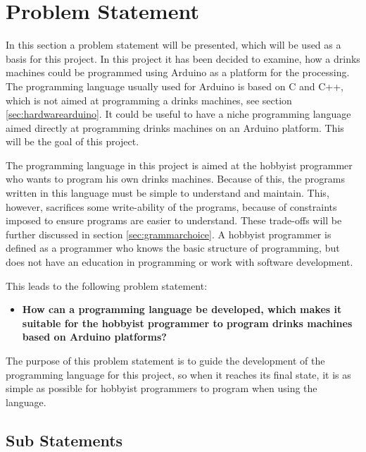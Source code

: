 \section{Problem Statement}
\label{sec:problemstatement}
In this section a problem statement will be presented, which will be used as a basis for this project. In this project it has been decided to examine, how a drinks machines could be programmed using Arduino as a platform for the processing. The programming language usually used for Arduino is based on C and C++, which is not aimed at programming a drinks machines, see section \ref{sec:hardwarearduino}. It could be useful to have a niche programming language aimed directly at programming drinks machines on an Arduino platform. This will be the goal of this project.

The programming language in this project is aimed at the hobbyist programmer who wants to program his own drinks machines. Because of this, the programs written in this language must be simple to understand and maintain. This, however, sacrifices some write-ability of the programs, because of constraints imposed to ensure programs are easier to understand. These trade-offs will be further discussed in section \ref{sec:grammarchoice}. A hobbyist programmer is defined as a programmer who knows the basic structure of programming, but does not have an education in programming or work with software development.

This leads to the following problem statement:
\begin{itemize}
	\item \textbf{How can a programming language be developed, which makes it suitable for the hobbyist programmer to program drinks machines based on Arduino platforms?}
\end{itemize}
The purpose of this problem statement is to guide the development of the programming language for this project, so when it reaches its final state, it is as simple as possible for hobbyist programmers to program when using the language. 

\subsection{Sub Statements}

